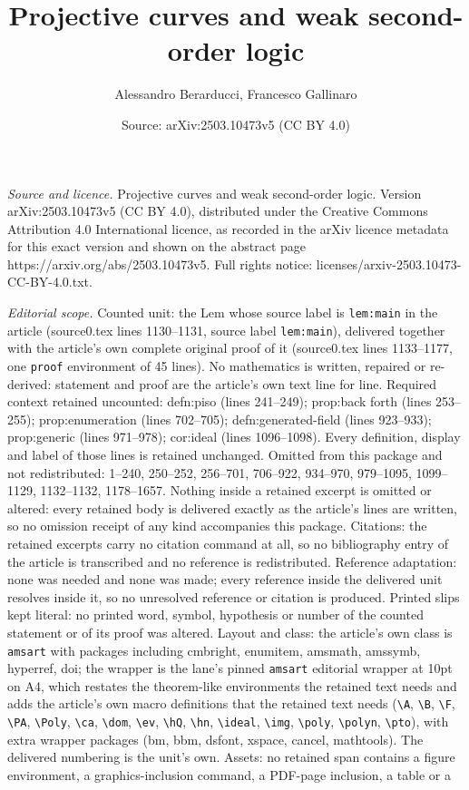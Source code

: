 \documentclass[10pt,a4paper]{amsart}
\title[Projective curves and weak second-order logic]{Projective curves and weak second-order logic}
\author{Alessandro Berarducci, Francesco Gallinaro}
\date{Source: arXiv:2503.10473v5 (CC BY 4.0)}
\begin{document}
\maketitle

\noindent\emph{Source and licence.} Projective curves and weak second-order logic. Version arXiv:2503.10473v5 (CC BY 4.0), distributed under the Creative Commons Attribution 4.0 International licence, as recorded in the arXiv licence metadata for this exact version and shown on the abstract page https://arxiv.org/abs/2503.10473v5. Full rights notice: licenses/arxiv-2503.10473-CC-BY-4.0.txt.\par\smallskip

\noindent\textit{Editorial scope.} Counted unit: the Lem whose source label is \texttt{lem:main} in the article (source0.tex lines 1130--1131, source label \texttt{lem:main}), delivered together with the article's own complete original proof of it (source0.tex lines 1133--1177, one \texttt{proof} environment of 45 lines). No mathematics is written, repaired or re-derived: statement and proof are the article's own text line for line. Required context retained uncounted: defn:piso (lines 241--249); prop:back forth (lines 253--255); prop:enumeration (lines 702--705); defn:generated-field (lines 923--933); prop:generic (lines 971--978); cor:ideal (lines 1096--1098). Every definition, display and label of those lines is retained unchanged. Omitted from this package and not redistributed: 1--240, 250--252, 256--701, 706--922, 934--970, 979--1095, 1099--1129, 1132--1132, 1178--1657. Nothing inside a retained excerpt is omitted or altered: every retained body is delivered exactly as the article's lines are written, so no omission receipt of any kind accompanies this package. Citations: the retained excerpts carry no citation command at all, so no bibliography entry of the article is transcribed and no reference is redistributed. Reference adaptation: none was needed and none was made; every reference inside the delivered unit resolves inside it, so no unresolved reference or citation is produced. Printed slips kept literal: no printed word, symbol, hypothesis or number of the counted statement or of its proof was altered. Layout and class: the article's own class is \texttt{amsart} with packages including cmbright, enumitem, amsmath, amssymb, hyperref, doi; the wrapper is the lane's pinned \texttt{amsart} editorial wrapper at 10pt on A4, which restates the theorem-like environments the retained text needs and adds the article's own macro definitions that the retained text needs (\texttt{\textbackslash A}, \texttt{\textbackslash B}, \texttt{\textbackslash F}, \texttt{\textbackslash PA}, \texttt{\textbackslash Poly}, \texttt{\textbackslash ca}, \texttt{\textbackslash dom}, \texttt{\textbackslash ev}, \texttt{\textbackslash hQ}, \texttt{\textbackslash hn}, \texttt{\textbackslash ideal}, \texttt{\textbackslash img}, \texttt{\textbackslash poly}, \texttt{\textbackslash polyn}, \texttt{\textbackslash pto}), with extra wrapper packages (bm, bbm, dsfont, xspace, cancel, mathtools). The delivered numbering is the unit's own. Assets: no retained span contains a figure environment, a graphics-inclusion command, a PDF-page inclusion, a table or a 
\end{document}
